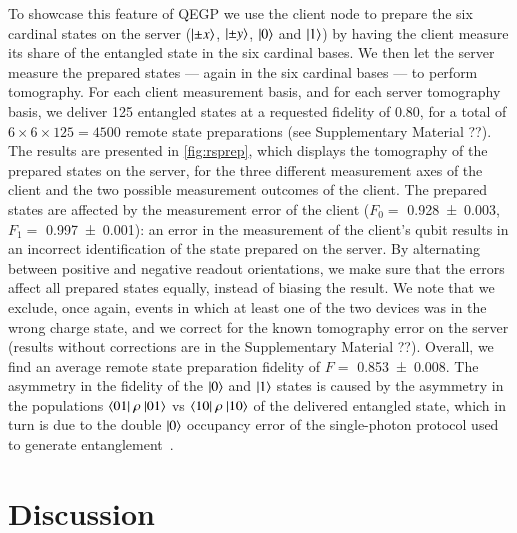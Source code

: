 To showcase this feature of QEGP we use the client node to prepare the six cardinal states on the
server ($\ket{\pm x}$, $\ket{\pm y}$, $\ket{0}$ and $\ket{1}$) by having the client measure its
share of the entangled state in the six cardinal bases. We then let the server measure the prepared
states --- again in the six cardinal bases --- to perform tomography. For each client measurement
basis, and for each server tomography basis, we deliver \num{125} entangled states at a requested
fidelity of \num{0.80}, for a total of $6 \times 6 \times 125 = 4500$ remote state preparations (see
Supplementary Material ??). The results are presented in \cref{fig:rsprep}, which displays the
tomography of the prepared states on the server, for the three different measurement axes of the
client and the two possible measurement outcomes of the client. The prepared states are affected by
the measurement error of the client ($F_0 =$ \num{0.928(3)}, $F_1 = $ \num{0.997(1)}): an error in
the measurement of the client's qubit results in an incorrect identification of the state prepared
on the server. By alternating between positive and negative readout orientations, we make sure that
the errors affect all prepared states equally, instead of biasing the result. We note that we
exclude, once again, events in which at least one of the two devices was in the wrong charge state,
and we correct for the known tomography error on the server (results without corrections are in the
Supplementary Material ??). Overall, we find an average remote state preparation fidelity of $F =$
\num{0.853(8)}. The asymmetry in the fidelity of the $\ket{0}$ and $\ket{1}$ states is caused by the
asymmetry in the populations $\braket{01|\ \rho\ |01}$ vs $\braket{10|\ \rho\ |10}$ of the delivered
entangled state, which in turn is due to the double $\ket{0}$ occupancy error of the single-photon
protocol used to generate entanglement~\cite{humphreys_2018_delivery, pompili_2021_multinode}.

\section{Discussion}

